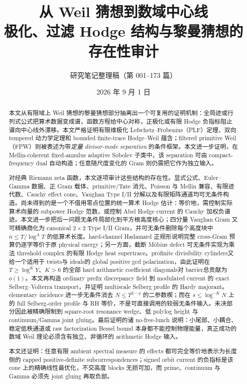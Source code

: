 \documentclass[UTF8,11pt,a4paper]{ctexart}
\title{\bfseries 从 Weil 猜想到数域中心线\\
\large 极化、过滤 Hodge 结构与黎曼猜想的存在性审计}
\author{研究笔记整理稿（第 001--173 篇）}
\date{2026 年 9 月 1 日}
\theoremstyle{definition}
\theoremstyle{remark}
\newcommand{\1}{\mathbf 1}
\begin{document}
\maketitle

\begin{abstract}
本文从有限域上 Weil 猜想的黎曼猜想部分抽离出一个可复用的证明机制：全局迹或行列式公式把算术数据变成谱，函数方程给中心对称，正极化或有限 Hodge 负指标阻止谱向中心线外漂移。本文严格证明有限维极化 Lefschetz--Frobenius（PLF）定理、双向 tempered 动力学定理和 bounded finite-trace Hodge--Weil 蕴含；filtered primitive Weil（FPW）则被表述为带\emph{定量 divisor-mode separation} 的条件框架。本文进一步证明，在 Mellin-coherent fixed-annulus adaptive Sobolev 子类中，该 separation 可由 compact-frequency dual 自动构造；任意随尺度变化的 Gram 则仍需把它作为独立输入。

对经典 Riemann zeta 函数，本文逐项审计这些结构的存在性。显式公式、Euler--Gamma 数据、正 Gram 载体、primitive/Tate 消元、Poisson 与 Mellin 兼容、有限迹代数、Cauchy effect cone、Vaughan Type I/II 分解以及有限矩阵通道均可无条件构造。尚未得到的是一个不借用零点位置的统一算术 Hodge 估计：等价地，需控制实际算术向量的 subpower Hodge 范数，或控制 Abel Hodge current 的 Cauchy 加权负谱迹。本文进一步把后一问题无条件局部化到平方根高度核心；四分量 Vaughan Gram 又可精确商化为 canonical $2\times2$ Type I/II Gram，并可无条件删除每个高度块中 $n\leq T/\log^A T$ 的低算术长度。hard-channel Hadamard 正规形说明完整 cross-Gram 预算仍逐字等价于原 physical energy；另一方面，截断 M\"obius defect 可无条件实现为乘法 threshold complex 的有限 Hodge heat supertrace。profinite divisibility cylinders又给一个适用于 twists与 ideals的 global positive gcd polarization，由此证明在 $T\geq\log^K Y$、$K>6$ 的全部 hard arithmetic coefficient diagonals对 barrier总贡献为 $o(1)$。本文再构造 ordinary prefix discrepancy field 到 modulated current 的 exact Selberg--Volterra transport，并证明 multiscale Selberg profile 的 Hardy majorant。elementary incidence 进一步无条件消去 $N\leq T^{2-\eta}$ 的二参数楔；而在 $s\leq\log^{-K}N$ 上的 full Selberg-order profile 与 RH 等价，不是可直接调用的较弱无条件输入。未决部分因此被精确限制到 square-root resonance wedge、低 polylog height 与 continuum/Gamma joint gluing。最后证明的诸 no-free-lunch 说明：小尾部、小耦合、稳定低秩通道或 raw factorization Bessel bound 本身都不能控制物理能量，真正成功的数域 Weil 理论必须含有独立、非循环的 arithmetic Hodge 输入。

本文还证明：任意有限 ambient spectral measure 的 effects 都可完全等价地表示为长度侧的 capped positive-definite subcorrespondences；signed orbit current 的负指标是该 cone 上的精确线性最优化，不交高度 blocks 无损可加，而 prime、continuum 与 Gamma 必须先 joint gluing 再取负部。


\end{abstract}
\end{document}
